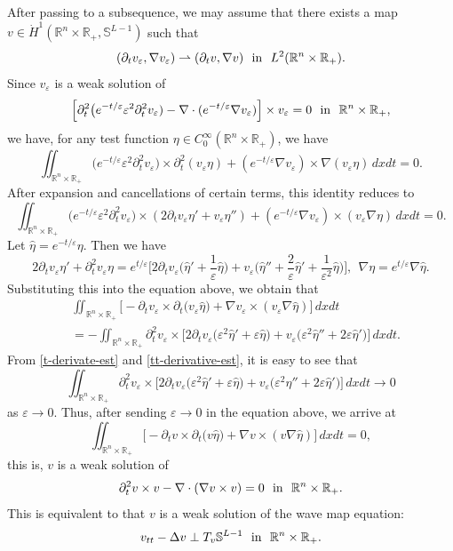 \documentclass[12pt,twoside,reqno]{amsart}
\theoremstyle{definition}              %
\theoremstyle{remark}                  %
\newcommand{\R}{\mathbb{R}}                 %
\newcommand{\eps}{\varepsilon}
\renewcommand{\1}{\mathbbm{1}}                                      %
\numberwithin{equation}{section}
\numberwithin{definition}{section}
\numberwithin{theorem}{section}
\numberwithin{remark}{section}
\begin{document}
After passing to a subsequence, we may assume that there exists a map $v\in \dot{H}^1(\mathbb{R}^n\times\mathbb{R}_+,\mathbb{S}^{L-1})$ such that
\[
(\partial_tv_\eps, \nabla v_\eps)
\rightharpoonup (\partial_tv, \nabla v) 
\ \ {\rm{in}}\ \ L^2(\mathbb{R}^n\times\mathbb{R}_+).
\]
Since $v_\eps$ is a weak solution of
\[
\Big[\partial_t^2\big(e^{-t/\eps} \eps^2 \partial_t^2v_\eps)
-\nabla\cdot(e^{-t/\eps}\nabla v_\eps)
\Big]\times v_\eps=0 \ \ {\rm{in}}\ \ \mathbb{R}^n\times\mathbb{R}_+,
\]
we have, for any test function $\eta\in C_0^\infty(\mathbb{R}^n\times\mathbb{R}_+)$,
we have 
\[
\iint_{\mathbb{R}^n\times\R_+}\big(e^{-t/\eps} \eps^2 \partial_t^2v_\eps\big)\times \partial_t^2(v_\eps\eta)+(e^{-t/\eps}\nabla v_\eps)\times \nabla(v_\eps\eta)\,dxdt
=0. 
\]
After expansion and cancellations of certain terms, this identity reduces to
\[
\iint_{\mathbb{R}^n\times\R_+}\big(e^{-t/\eps} \eps^2 \partial_t^2v_\eps\big)\times (2\partial_tv_\eps\eta'+v_\eps \eta'')+(e^{-t/\eps}\nabla v_\eps)\times (v_\eps\nabla\eta)\,dxdt
=0. 
\]
Let $\hat{\eta}=e^{-t/\eps}\eta$. Then we have
$$
2\partial_tv_\eps\eta'+\partial_t^2v_\eps\eta
=e^{t/\eps}\Big[2\partial_tv_\eps\big(\hat{\eta}'+\frac{1}{\eps}\hat{\eta}\big)
+v_\eps\big(\hat{\eta}''+\frac{2}{\eps}\hat{\eta}'+\frac{1}{\eps^2}\hat{\eta}\big)\Big],
\ \ \nabla\eta=e^{t/\eps}\nabla\hat{\eta}.
$$
Substituting this into the equation above, we obtain that
\begin{align*}
&\iint_{\mathbb{R}^n\times\R_+}
\big[-\partial_tv_\eps\times \partial_t\big(v_\eps\hat{\eta}\big)
+\nabla v_\eps\times (v_\eps\nabla\hat{\eta})\big]\,dxdt\\
&=-\iint_{\mathbb{R}^n\times\R_+}
\partial_t^2v_\eps\times \Big[2\partial_tv_\eps\big(\eps^2\hat{\eta}'+\eps
\hat{\eta}\big)+v_\eps\big(\eps^2\hat{\eta}''+2\eps\hat{\eta}'\big)\Big]\,dxdt.
\end{align*}
From \eqref{t-derivate-est} and
\eqref{tt-derivative-est}, it is easy to see that
\[
\iint_{\mathbb{R}^n\times\R_+}
\partial_t^2v_\eps\times \Big[2\partial_tv_\eps\big(\eps^2\hat{\eta}'+\eps
\hat{\eta}\big)+v_\eps\big(\eps^2\hat{\eta}''+2\eps\hat{\eta}'\big)\Big]\,dxdt\to 0
\]
as $\eps\to 0$. Thus, after sending $\eps\to 0$ in the equation above, we arrive at
\[
\iint_{\mathbb{R}^n\times\R_+}
\big[-\partial_tv\times \partial_t\big(v\hat{\eta}\big)
+\nabla v\times (v\nabla\hat{\eta})\big]\,dxdt=0,
\]
this is,
$v$ is a weak solution of
\[
\partial_t^2v\times v-\nabla\cdot(\nabla v\times v)=0
\ \ {\rm{in}}\ \ \mathbb{R}^n\times\mathbb{R}_+.
\]
This is equivalent to that $v$ is a weak solution of the wave map equation:
\[
v_{tt}-\Delta v\perp T_v \mathbb{S}^{L-1}
\ \ {\rm{in}}\ \ \mathbb{R}^n\times\mathbb{R}_+.
\]
\end{document}
